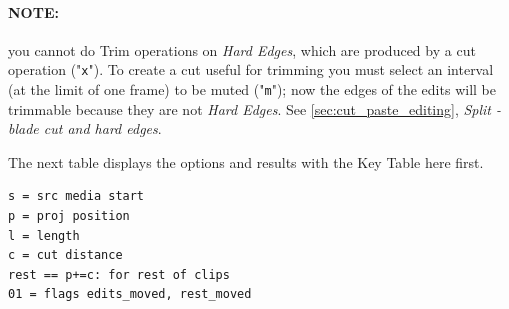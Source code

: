 \paragraph{NOTE:} you cannot do Trim operations on \textit{Hard Edges}, which are produced by a cut operation ("\texttt{x}"). To create a cut useful for trimming you must select an interval (at the limit of one frame) to be muted ("\texttt{m}"); now the edges of the edits will be trimmable because they are not \textit{Hard Edges}. See \ref{sec:cut_paste_editing}, \textit{Split - blade cut and hard edges}.

The next table displays the options and results
with the Key Table here first.

\begin{lstlisting}[style=sh]
s = src media start
p = proj position
l = length
c = cut distance
rest == p+=c: for rest of clips
01 = flags edits_moved, rest_moved
\end{lstlisting}

\renewcommand{\arraystretch}{1.15}

